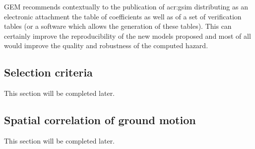 GEM recommends contextually to the publication of \gls{acr:gsim}
distributing as an electronic attachment the table of coefficients as well 
as of a set of verification tables (or a software which allows the generation 
of these tables). This can certainly improve the reproducibility of the 
new models proposed and most of all would improve the quality and 
robustness of the computed hazard.
%
\subsection{Selection criteria}
%
This section will be completed later.
%
\subsection{Spatial correlation of ground motion}
This section will be completed later.

